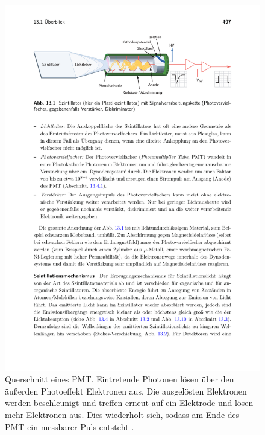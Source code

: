 \begin{figure}
    \centering
    \includegraphics[width=.8\textwidth]{content/pics/PMT.pdf}
    \caption{Querschnitt eines PMT. Eintretende Photonen lösen über den äußerden Photoeffekt Elektronen aus. Die ausgelösten Elektronen werden beschleunigt und treffen erneut %
    auf ein Elektrode und lösen mehr Elektronen aus. Dies wiederholt sich, sodass am Ende des PMT ein messbarer Puls entsteht \cite{Wermes}.}
    \label{fig:PMT}
 \end{figure}


